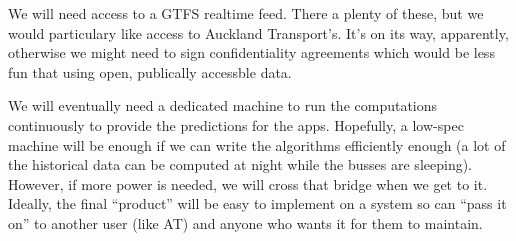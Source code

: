 \documentclass[12pt,a4paper]{article}
\begin{document}
















We will need access to a GTFS realtime feed.
There a plenty of these, but we would particulary like access to Auckland Transport's.
It's on its way, apparently, otherwise we might need to sign confidentiality agreements which would be less 
fun that using open, publically accessble data.


We will eventually need a dedicated machine to run the computations continuously to provide the predictions
for the apps.
Hopefully, a low-spec machine will be enough if we can write the algorithms efficiently enough 
(a lot of the historical data can be computed at night while the busses are sleeping).
However, if more power is needed, we will cross that bridge when we get to it.
Ideally, the final ``product'' will be easy to implement on a system so can ``pass it on''
to another user (like AT) and anyone who wants it for them to maintain.
\end{document}
